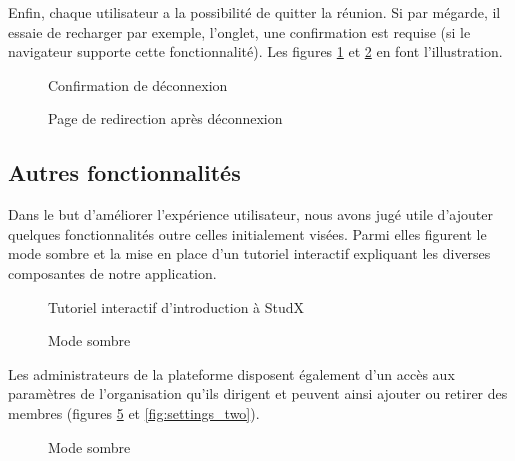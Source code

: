 Enfin, chaque utilisateur a la possibilité de quitter la réunion. Si par mégarde, il essaie de recharger par exemple, l’onglet, une confirmation est requise (si le navigateur supporte cette fonctionnalité). 
Les figures \ref{fig:confirm_exit} et \ref{fig:exited} en font l'illustration.

\newpage
\begin{figure}[h]
  \centering
  \caption{Confirmation de déconnexion}
  \label{fig:confirm_exit}
\end{figure}

\begin{figure}[h]
  \centering
  \caption{Page de redirection après déconnexion}
  \label{fig:exited}
\end{figure}

\subsection{Autres fonctionnalités}
Dans le but d'améliorer l'expérience utilisateur, nous avons jugé utile d’ajouter quelques fonctionnalités outre celles initialement visées. 
Parmi elles figurent le mode sombre et la mise en place d’un tutoriel interactif expliquant les diverses composantes de notre application. 

\newpage
\begin{figure}[h]
  \centering
  \caption{Tutoriel interactif d’introduction à StudX}
  \label{fig:onboarding}
\end{figure}


\begin{figure}[h]
  \centering
  \caption{Mode sombre}
  \label{fig:dark_mode}
\end{figure}

Les administrateurs de la plateforme disposent également d’un accès aux paramètres de 
l'organisation qu’ils dirigent et peuvent ainsi ajouter ou retirer des membres (figures \ref{fig:settings_one} et \ref{fig:settings_two}).

\begin{figure}[h]
  \centering
  \caption{Mode sombre}
  \label{fig:settings_one}
\end{figure}

